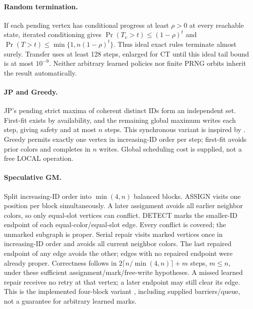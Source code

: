 \documentclass[10pt]{article}
\begin{document}
\paragraph{Random termination.}
If each pending vertex has conditional progress at least $\rho>0$ at every
reachable state, iterated conditioning gives
$\Pr(T_v>t)\le(1-\rho)^t$ and
$\Pr(T>t)\le\min\{1,n(1-\rho)^t\}$. Thus ideal exact rules terminate
almost surely. Transfer uses at least 128 steps, enlarged for CT until this
ideal tail bound is at most $10^{-9}$. Neither arbitrary learned policies
nor finite PRNG orbits inherit the result automatically.

\paragraph{JP and Greedy.}
JP's pending strict maxima of coherent distinct IDs form an independent set.
First-fit exists by availability, and the remaining global maximum writes
each step, giving safety and at most $n$ steps. This synchronous variant is
inspired by \citet{jones1993parallel}. Greedy permits exactly one vertex in
increasing-ID order per step; first-fit avoids prior colors and completes in
$n$ writes. Global scheduling cost is supplied, not a free LOCAL operation.

\paragraph{Speculative GM.}
Split increasing-ID order into $\min(4,n)$ balanced blocks. ASSIGN visits
one position per block simultaneously. A later assignment avoids all earlier
neighbor colors, so only equal-slot vertices can conflict. DETECT marks the
smaller-ID endpoint of each equal-color/equal-slot edge. Every conflict is
covered; the unmarked subgraph is proper. Serial repair visits marked vertices
once in increasing-ID order and avoids all current neighbor colors. The last
repaired endpoint of any edge avoids the other; edges with no repaired
endpoint were already proper. Correctness follows in
$2\lceil n/\min(4,n)\rceil+m$ steps, $m\le n$, under these sufficient
assignment/mark/free-write hypotheses. A missed learned repair receives no
retry at that vertex; a later endpoint may still clear its edge. This is the
implemented four-block variant \citep{gebremedhin2000scalable}, including
supplied barriers/queue, not a guarantee for arbitrary learned marks.
\end{document}
